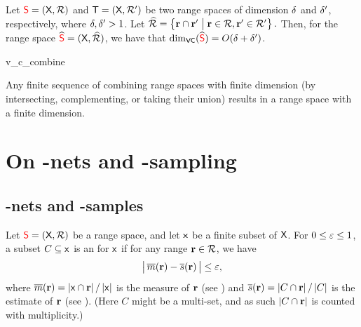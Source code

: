 



\begin{corollary}
    Let ${\textcolor{red}{\mathsf{S}}} =(\textsf{X}, {\mathcal{R}})$ and $\mathsf{T} =
    (\textsf{X}, \mathcal{R}')$ be two range spaces of \VC dimension
    $\delta$ and $\delta'$, respectively, where $\delta,\delta' > 1$. Let
    \begin{math}
        \widehat{\RangeSet}%
        =%
        \Set{ \range \cap \rangeA }{ \range \in \RangeSet, \rangeA \in
           \RangeSetA \bigr.}.
    \end{math}
      Then, for the range
    space $\widehat{{\textcolor{red}{\mathsf{S}}}} = (\textsf{X}, \widehat{{\mathcal{R}}})$,
    we have that $\mathrm{dim}_{\mathsf{VC}}( \widehat{{\textcolor{red}{\mathsf{S}}}} ) = O( \delta + \delta')$.
\end{corollary}

\begin{fragment}{v_c_combine}
    \begin{corollary}
        Any finite sequence of combining range spaces with finite \VC
        dimension (by intersecting, complementing, or taking their
        union) results in a range space with a finite \VC dimension.
        
    \end{corollary}
\end{fragment}


\section{On -nets and
   -sampling}


\subsection{-nets and
   -samples}


\begin{defn}
    Let ${\textcolor{red}{\mathsf{S}}} = (\textsf{X},{\mathcal{R}})$ be a range space, and
    let $\mathsf{x}$ be a finite subset of $\textsf{X}$. For $0 \leq
    {\varepsilon} \leq 1$, a subset $C \subseteq \mathsf{x}$ is an
     for $\mathsf{x}$ if
    for any range $\mathbf{r} \in {\mathcal{R}}$, we have
    \begin{align*}
      \cardin{\, \Measure{\range} - \sMeasure{\range} \bigr.\, }%
      \leq%
      \eps,
    \end{align*}
    where
    $\Measure{\range} = {\cardin{\FGroundSet \cap \range}} \, /\,
    {\cardin{\FGroundSet}}$ is the measure of $\mathbf{r}$ (see
    ) and
    $\sMeasure{\range} = {\cardin{C \cap \range}} \, /\,{\cardin{C}}$
    is the estimate of $\mathbf{r}$ (see ).  (Here $C$
    might be a multi-set, and as such $\left| {C \cap \mathbf{r}} \right|$ is
    counted with multiplicity.)
\end{defn}

